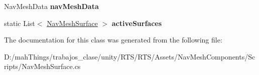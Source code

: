 \begin{DoxyCompactItemize}
\item 
\mbox{\label{class_unity_engine_1_1_a_i_1_1_nav_mesh_surface_af93626d806baafc9dd6cf35878f1c5ea}} 
Nav\+Mesh\+Data {\bfseries nav\+Mesh\+Data}
\item 
\mbox{\label{class_unity_engine_1_1_a_i_1_1_nav_mesh_surface_a6fa2eb9e7b828c14c88eedd5ef7a3ac5}} 
static List$<$ \mbox{\hyperlink{class_unity_engine_1_1_a_i_1_1_nav_mesh_surface}{Nav\+Mesh\+Surface}} $>$ {\bfseries active\+Surfaces}
\end{DoxyCompactItemize}


The documentation for this class was generated from the following file\+:\begin{DoxyCompactItemize}
\item 
D\+:/mah\+Things/trabajos\+\_\+clase/unity/\+R\+T\+S/\+R\+T\+S/\+Assets/\+Nav\+Mesh\+Components/\+Scripts/Nav\+Mesh\+Surface.\+cs\end{DoxyCompactItemize}
